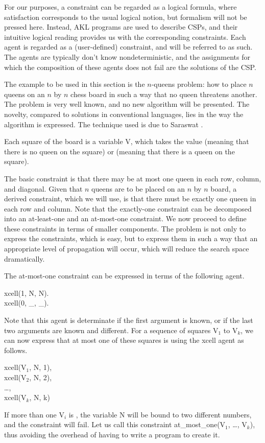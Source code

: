 For our purposes, a constraint can be regarded as a logical formula,
where satisfaction corresponds to the usual logical notion, but
formalism will not be pressed here.  Instead, AKL programs are used to
describe CSPs, and their intuitive logical reading provides us with
the corresponding constraints.  Each agent is regarded as a
(user-defined) constraint, and will be referred to as such.  The
agents are typically don't know nondeterministic, and the assignments
for which the composition of these agents does not fail are the
solutions of the CSP.

The example to be used in this section is the $n$-queens problem: how
to place $n$ queens on an $n$ by $n$ chess board in such a way that no
queen threatens another.  The problem is very well known, and no new
algorithm will be presented.  The novelty, compared to solutions in
conventional languages, lies in the way the algorithm is expressed.
The technique used is due to Saraswat \cite{sar93}.

Each square of the board is a variable {\prog V}, which takes the
value {} (meaning that there is no queen on the square) or
{} (meaning that there is a queen on the square).

The basic constraint is that there may be at most one queen in each
row, column, and diagonal.  Given that $n$ queens are to be placed on
an $n$ by $n$ board, a derived constraint, which we will use, is that
there must be exactly one queen in each row and column.  Note that the
exactly-one constraint can be decomposed into an at-least-one and an
at-most-one constraint.  We now proceed to define these constraints in
terms of smaller components.  The problem is not only to express the
constraints, which is easy, but to express them in such a way that an
appropriate level of propagation will occur, which will reduce the
search space dramatically.

The at-most-one constraint can be expressed in terms of the following
agent.
%
\begin{program}
xcell(1, N, N).  \\
xcell(0, _, _).
\end{program}%
%
Note that this agent is determinate if the first argument is known, or
if the last two arguments are known and different.  For a sequence of
squares {\prog V$_1$} to {\prog V$_k$,} we can now express that at most one
of these squares is {} using the {\prog xcell} agent as follows.
%
\begin{progex}
xcell(V$_1$, N, 1), \\
xcell(V$_2$, N, 2), \\
\dots, \\
xcell(V$_k$, N, k)
\end{progex}%
%
If more than one {\prog V$_i$} is {}, the variable {\prog N}
will be bound to two different numbers, and the constraint will fail.
Let us call this constraint {\prog at_most_one(V$_1$, \dots, V$_k$)}, thus
avoiding the overhead of having to write a program to create it.

